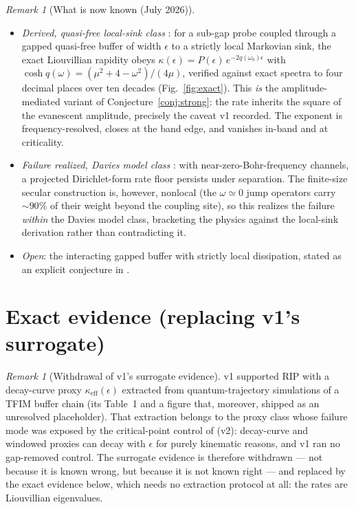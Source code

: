 \documentclass[11pt,a4paper]{article}
\theoremstyle{plain}
\theoremstyle{definition}
\theoremstyle{remark}
\newtheorem{remark}[theorem]{Remark}
\newcommand{\eps}{\epsilon}
\begin{document}
\begin{remark}[What is now known (July 2026)]\label{rem:status}
\leavevmode
\begin{itemize}
\item \emph{Derived, quasi-free local-sink class} \cite{HCut}: for a sub-gap
probe coupled through a gapped quasi-free buffer of width $\eps$ to a strictly
local Markovian sink, the exact Liouvillian rapidity obeys
$\kappa(\eps) = P(\eps)\, e^{-2q(\omega_b)\eps}$ with
$\cosh q(\omega) = (\mu^2 + 4 - \omega^2)/(4\mu)$, verified against exact
spectra to four decimal places over ten decades (Fig.~\ref{fig:exact}). This
\emph{is} the amplitude-mediated variant of Conjecture~\ref{conj:strong}: the
rate inherits the square of the evanescent amplitude, precisely the caveat v1
recorded. The exponent is frequency-resolved, closes at the band edge, and
vanishes in-band and at criticality.
\item \emph{Failure realized, Davies model class} \cite{Stress}: with
near-zero-Bohr-frequency channels, a projected Dirichlet-form rate floor
persists under separation. The finite-size secular construction is,
however, nonlocal (the $\omega \simeq 0$ jump operators carry $\sim 90\%$ of
their weight beyond the coupling site), so this realizes the failure
\emph{within} the Davies model class, bracketing the physics against the
local-sink derivation rather than contradicting it.
\item \emph{Open}: the interacting gapped buffer with strictly local
dissipation, stated as an explicit conjecture in \cite{HCut}.
\end{itemize}
\end{remark}

\section{Exact evidence (replacing v1's surrogate)}\label{sec:evidence}

\begin{remark}[Withdrawal of v1's surrogate evidence]\label{rem:withdrawal}
v1 supported RIP with a decay-curve proxy $\kappa_{\mathrm{eff}}(\eps)$
extracted from quantum-trajectory simulations of a TFIM buffer chain
(its Table~1 and a figure that, moreover, shipped as an unresolved
placeholder). That extraction belongs to the proxy class whose failure mode
was exposed by the critical-point control of \cite{HCut} (v2): decay-curve and
windowed proxies can decay with $\eps$ for purely kinematic reasons, and v1
ran no gap-removed control. The surrogate evidence is therefore withdrawn ---
not because it is known wrong, but because it is not known right --- and
replaced by the exact evidence below, which needs no extraction protocol at
all: the rates are Liouvillian eigenvalues.
\end{remark}
\end{document}
